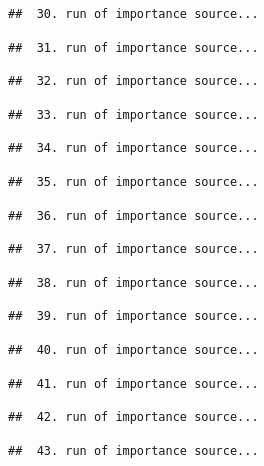 \documentclass[
]{article}
\begin{document}
\begin{verbatim}
##  30. run of importance source...
\end{verbatim}

\begin{verbatim}
##  31. run of importance source...
\end{verbatim}

\begin{verbatim}
##  32. run of importance source...
\end{verbatim}

\begin{verbatim}
##  33. run of importance source...
\end{verbatim}

\begin{verbatim}
##  34. run of importance source...
\end{verbatim}

\begin{verbatim}
##  35. run of importance source...
\end{verbatim}

\begin{verbatim}
##  36. run of importance source...
\end{verbatim}

\begin{verbatim}
##  37. run of importance source...
\end{verbatim}

\begin{verbatim}
##  38. run of importance source...
\end{verbatim}

\begin{verbatim}
##  39. run of importance source...
\end{verbatim}

\begin{verbatim}
##  40. run of importance source...
\end{verbatim}

\begin{verbatim}
##  41. run of importance source...
\end{verbatim}

\begin{verbatim}
##  42. run of importance source...
\end{verbatim}

\begin{verbatim}
##  43. run of importance source...
\end{verbatim}
\end{document}
